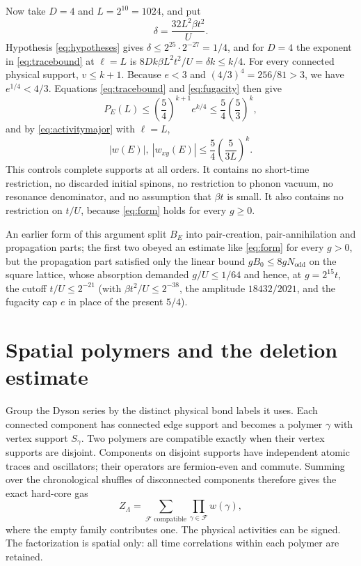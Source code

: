 \documentclass[11pt]{article}
\newcommand{\Nodd}{N_{\mathrm{odd}}}
\begin{document}
Now take $D=4$ and $L=2^{10}=1024$, and put
\[
 \delta=\frac{32L^2\beta t^2}{U}.
\]
Hypothesis \eqref{eq:hypotheses} gives $\delta\le2^{25}\cdot2^{-27}=1/4$, and for $D=4$ the exponent in \eqref{eq:tracebound} at $\ell=L$ is $8Dk\beta L^2t^2/U=\delta k\le k/4$. For every connected physical support, $v\le k+1$. Because $e<3$ and $(4/3)^4=256/81>3$, we have $e^{1/4}<4/3$. Equations \eqref{eq:tracebound} and \eqref{eq:fugacity} then give
\[
 P_E(L)\le\left(\frac54\right)^{k+1}e^{k/4}\le\frac54\left(\frac53\right)^k,
\]
and by \eqref{eq:activitymajor} with $\ell=L$,
\begin{equation}\label{eq:activity}
 |w(E)|,\ |w_{xy}(E)|\le\frac54\left(\frac{5}{3L}\right)^k.
\end{equation}
This controls complete supports at all orders. It contains no short-time restriction, no discarded initial spinons, no restriction to phonon vacuum, no resonance denominator, and no assumption that $\beta t$ is small. It also contains no restriction on $t/U$, because \eqref{eq:form} holds for every $g\ge0$.

An earlier form of this argument split $B_E$ into pair-creation, pair-annihilation and propagation parts; the first two obeyed an estimate like \eqref{eq:form} for every $g>0$, but the propagation part satisfied only the linear bound $gB_0\le8g\Nodd$ on the square lattice, whose absorption demanded $g/U\le1/64$ and hence, at $g=2^{15}t$, the cutoff $t/U\le2^{-21}$ (with $\beta t^2/U\le2^{-38}$, the amplitude $18432/2021$, and the fugacity cap $e$ in place of the present $5/4$).

\section{Spatial polymers and the deletion estimate}

Group the Dyson series by the distinct physical bond labels it uses. Each connected component has connected edge support and becomes a polymer $\gamma$ with vertex support $S_\gamma$. Two polymers are compatible exactly when their vertex supports are disjoint. Components on disjoint supports have independent atomic traces and oscillators; their operators are fermion-even and commute. Summing over the chronological shuffles of disconnected components therefore gives the exact hard-core gas
\[
 Z_\Lambda=\sum_{\mathcal F\text{ compatible}}\prod_{\gamma\in\mathcal F}w(\gamma),
\]
where the empty family contributes one. The physical activities can be signed. The factorization is spatial only: all time correlations within each polymer are retained.
\end{document}
